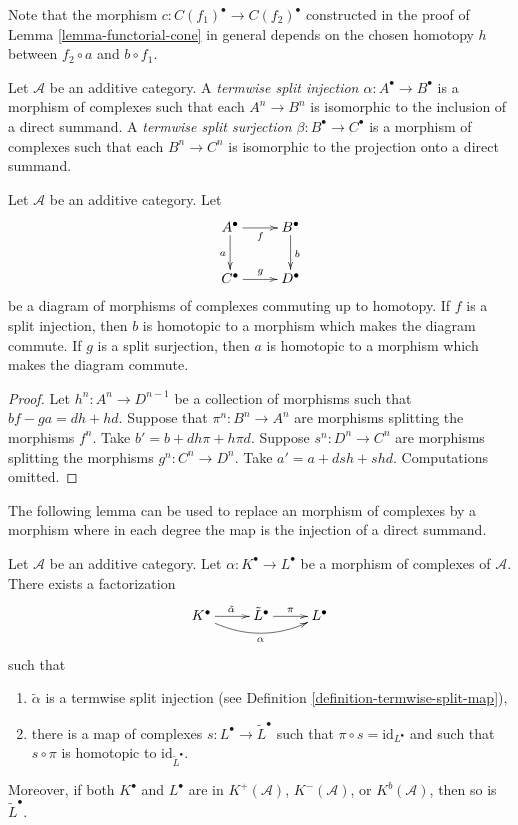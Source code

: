 \noindent
Note that the morphism $c : C(f_1)^\bullet \to C(f_2)^\bullet$
constructed in the
proof of Lemma \ref{lemma-functorial-cone} in general depends on the
chosen homotopy $h$ between $f_2 \circ a$ and $b \circ f_1$.

\begin{definition}
\label{definition-termwise-split-map}
Let $\mathcal{A}$ be an additive category.
A {\it termwise split injection $\alpha : A^\bullet \to B^\bullet$}
is a morphism of complexes such that each $A^n \to B^n$
is isomorphic to the inclusion of a direct summand.
A {\it termwise split surjection $\beta : B^\bullet \to C^\bullet$}
is a morphism of complexes such that each $B^n \to C^n$
is isomorphic to the projection onto a direct summand.
\end{definition}

\begin{lemma}
\label{lemma-make-commute-map}
Let $\mathcal{A}$ be an additive category.
Let
$$
\xymatrix{
A^\bullet \ar[r]_f \ar[d]_a & B^\bullet \ar[d]^b \\
C^\bullet \ar[r]^g & D^\bullet
}
$$
be a diagram of morphisms of complexes commuting up to homotopy.
If $f$ is a split injection, then $b$ is homotopic to a
morphism which makes the diagram commute.
If $g$ is a split surjection, then $a$ is homotopic to a
morphism which makes the diagram commute.
\end{lemma}

\begin{proof}
Let $h^n : A^n \to D^{n - 1}$ be a collection of morphisms
such that $bf - ga = dh + hd$. Suppose that $\pi^n : B^n \to A^n$
are morphisms splitting the morphisms $f^n$.
Take $b' = b + dh\pi + h\pi d$.
Suppose $s^n : D^n \to C^n$ are morphisms splitting the morphisms
$g^n : C^n \to D^n$. Take $a' = a + dsh + shd$.
Computations omitted.
\end{proof}


\noindent
The following lemma can be used to replace an morphism of complexes
by a morphism where in each degree the map is the injection of a
direct summand.

\begin{lemma}
\label{lemma-make-injective}
Let $\mathcal{A}$ be an additive category.
Let $\alpha : K^\bullet \to L^\bullet$ be a morphism
of complexes of $\mathcal{A}$.
There exists a factorization
$$
\xymatrix{
K^\bullet \ar[r]^{\tilde \alpha} \ar@/_1pc/[rr]_\alpha &
\tilde L^\bullet \ar[r]^\pi &
L^\bullet
}
$$
such that
\begin{enumerate}
\item $\tilde \alpha$ is a termwise split injection (see
Definition \ref{definition-termwise-split-map}),
\item there is a map of complexes $s : L^\bullet \to \tilde L^\bullet$
such that $\pi \circ s = \text{id}_{L^\bullet}$ and such that
$s \circ \pi$ is homotopic to $\text{id}_{\tilde L^\bullet}$.
\end{enumerate}
Moreover, if both $K^\bullet$ and $L^\bullet$ are in
$K^{+}(\mathcal{A})$, $K^{-}(\mathcal{A})$, or $K^b(\mathcal{A})$,
then so is $\tilde L^\bullet$.
\end{lemma}

